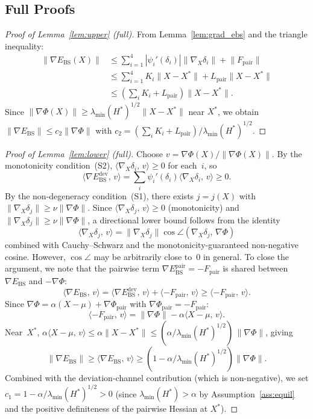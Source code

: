 \documentclass[final]{siamltex}
\newcommand{\norm}[1]{\lVert #1 \rVert}
\newcommand{\inner}[2]{\langle #1,\, #2 \rangle}
\providecommand{\grad}{\nabla}
\newcommand{\Ebs}{E_{\mathrm{BS}}}
\newcommand{\Xst}{X^*}
\newcommand{\Lpair}{L_{\mathrm{pair}}}
\newcommand{\lmin}{\lambda_{\min}}
\begin{document}
\begin{appendix}

\section{Full Proofs}\label{app:proofs}

\begin{proof}[Proof of Lemma~\ref{lem:upper} (full)]
From Lemma~\ref{lem:grad_ebs} and the triangle inequality:
\begin{align*}
  \norm{\grad\Ebs(X)}
  &\le \sum_{i=1}^{4}|\psi_i'(\delta_i)|\norm{\grad_X\delta_i}
  + \norm{F_{\mathrm{pair}}}\\
  &\le \sum_{i=1}^{4}K_i\norm{X{-}\Xst}+\Lpair\norm{X{-}\Xst}\\
  &\le (\textstyle\sum_i K_i+\Lpair)\norm{X{-}\Xst}.
\end{align*}
Since $\norm{\grad\Phi(X)}\ge\lmin(H^*)^{1/2}\norm{X{-}\Xst}$
near $\Xst$, we obtain $\norm{\grad\Ebs}\le c_2\norm{\grad\Phi}$
with $c_2=(\sum_i K_i+\Lpair)/\lmin(H^*)^{1/2}$.
\end{proof}

\begin{proof}[Proof of Lemma~\ref{lem:lower} (full)]
Choose $v=\grad\Phi(X)/\norm{\grad\Phi(X)}$. By the
monotonicity condition~(S2),
$\inner{\grad_X\delta_i}{v}\ge 0$ for each~$i$, so
\[
  \inner{\grad\Ebs^{\mathrm{dev}}}{v}
  = \sum_i\psi_i'(\delta_i)\inner{\grad_X\delta_i}{v}
  \ge 0.
\]
By the non-degeneracy condition~(S1), there exists $j = j(X)$
with $\norm{\grad_X\delta_j}\ge\nu\norm{\grad\Phi}$.
Since $\inner{\grad_X\delta_j}{v}\ge 0$ (monotonicity) and
$\norm{\grad_X\delta_j}\ge\nu\norm{\grad\Phi}$, a directional
lower bound follows from the identity
\[
  \inner{\grad_X\delta_j}{v}
  = \norm{\grad_X\delta_j}
    \cos\angle(\grad_X\delta_j,\,\grad\Phi)
\]
combined with Cauchy--Schwarz and the monotonicity-guaranteed
non-negative cosine.  However, $\cos\angle$ may be arbitrarily
close to~$0$ in general.  To close the argument, we note that
the pairwise term $\grad\Ebs^{\mathrm{pair}} = -F_{\mathrm{pair}}$
is shared between $\grad\Ebs$ and $-\grad\Phi$:
\[
  \inner{\grad\Ebs}{v}
  = \inner{\grad\Ebs^{\mathrm{dev}}}{v}
  + \inner{-F_{\mathrm{pair}}}{v}
  \ge \inner{-F_{\mathrm{pair}}}{v}.
\]
Since $\grad\Phi = \alpha(X{-}\mu) + \grad\Phi_{\mathrm{pair}}$
with $\grad\Phi_{\mathrm{pair}} = -F_{\mathrm{pair}}$:
\[
  \inner{-F_{\mathrm{pair}}}{v}
  = \norm{\grad\Phi} - \alpha\inner{X{-}\mu}{v}.
\]
Near~$\Xst$,
$\alpha\inner{X{-}\mu}{v} \le \alpha\norm{X{-}\Xst}
\le (\alpha/\lmin(H^*)^{1/2})\,\norm{\grad\Phi}$, giving
\[
  \norm{\grad\Ebs}\ge\inner{\grad\Ebs}{v}
  \ge (1 - \alpha/\lmin(H^*)^{1/2})\norm{\grad\Phi}.
\]
Combined with the deviation-channel contribution (which is
non-negative), we set
$c_1 = 1 - \alpha/\lmin(H^*)^{1/2} > 0$
(since $\lmin(H^*) > \alpha$ by Assumption~\ref{ass:equil} and
the positive definiteness of the pairwise Hessian at $\Xst$).
\end{proof}


\end{appendix}
\end{document}
